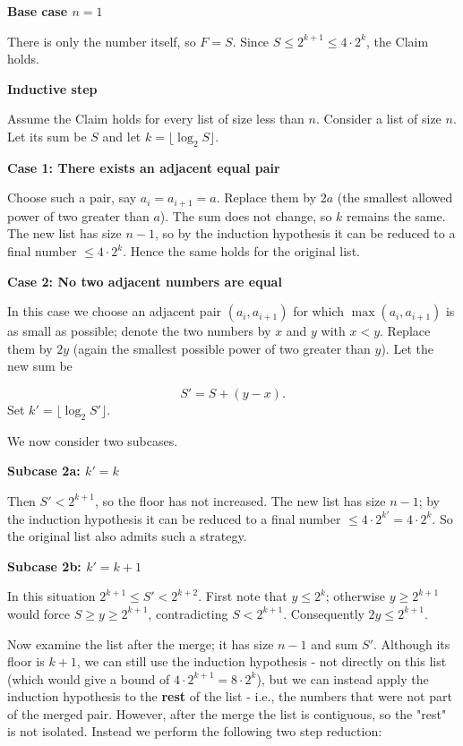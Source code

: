 \documentclass{llmxive}
\providecommand{\solutionheading}[1]{\par\smallskip\noindent\textbf{#1}\par}
\begin{document}
\smallskip
\solutionheading{Base case \(n = 1\)}
There is only the number itself, so \(F = S\). Since \(S \le 2^{k+1} \le 4 \cdot 2^{k}\), the Claim holds.\par
\smallskip
\solutionheading{Inductive step}
Assume the Claim holds for every list of size less than \(n\). Consider a list of size \(n\). Let its sum be \(S\) and let \(k = \lfloor \log_2 S \rfloor\).\par
\solutionheading{Case 1: There exists an adjacent equal pair}
Choose such a pair, say \(a_i = a_{i+1} = a\). Replace them by \(2a\) (the smallest allowed power of two greater than \(a\)). The sum does not change, so \(k\) remains the same. The new list has size \(n-1\), so by the induction hypothesis it can be reduced to a final number \(\le 4 \cdot 2^{k}\). Hence the same holds for the original list.\par
\solutionheading{Case 2: No two adjacent numbers are equal}
In this case we choose an adjacent pair \((a_i, a_{i+1})\) for which \(\max(a_i, a_{i+1})\) is as small as possible; denote the two numbers by \(x\) and \(y\) with \(x < y\). Replace them by \(2y\) (again the smallest possible power of two greater than \(y\)). Let the new sum be\par
\[
S' = S + (y - x).
\]
Set \(k' = \lfloor \log_2 S' \rfloor\).\par
We now consider two subcases.\par
\solutionheading{Subcase 2a: \(k' = k\)}
Then \(S' < 2^{k+1}\), so the floor has not increased. The new list has size \(n-1\); by the induction hypothesis it can be reduced to a final number \(\le 4 \cdot 2^{k'} = 4 \cdot 2^{k}\). So the original list also admits such a strategy.\par
\solutionheading{Subcase 2b: \(k' = k+1\)}
In this situation \(2^{k+1} \le S' < 2^{k+2}\). First note that \(y \le 2^{k}\); otherwise \(y \ge 2^{k+1}\) would force \(S \ge y \ge 2^{k+1}\), contradicting \(S < 2^{k+1}\). Consequently \(2y \le 2^{k+1}\).\par
Now examine the list after the merge; it has size \(n-1\) and sum \(S'\). Although its floor is \(k+1\), we can still use the induction hypothesis - not directly on this list (which would give a bound of \(4 \cdot 2^{k+1} = 8 \cdot 2^{k}\)), but we can instead apply the induction hypothesis to the \textbf{rest} of the list - i.e., the numbers that were not part of the merged pair. However, after the merge the list is contiguous, so the "rest" is not isolated. Instead we perform the following two step reduction:\par
\end{document}
